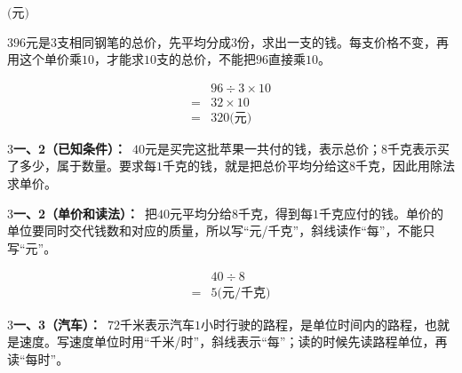 \documentclass[multi=snippet,border={5bp 20bp 5bp 5bp}]{standalone}
\newenvironment{snippet}[3]{\begin{minipage}{#1bp}\color{answerred}\fontsize{#2}{#3}\selectfont\raggedright}{\end{minipage}}
\begin{document}
\begin{snippet}{80}{10.0}{14}\SourceSans\setlength{\mathindent}{2bp}\(\text{(元)}\)\end{snippet}
\begin{snippet}{505}{11.5}{14}\begin{multicols}{3}\raggedcolumns \(96\)\allowbreak 元是\(3\)\allowbreak 支相同钢笔的总价，先平均分成\(3\)\allowbreak 份，求出一支的钱。每支价格不变，再用这个单价乘\(10\)\allowbreak ，才能求\(10\)\allowbreak 支的总价，不能把\(96\)\allowbreak 直接乘\(10\)\allowbreak 。\par \[\begin{aligned}&96\div3\times10\\={}&32\times10\\={}&320\text{(元)}\end{aligned}\]\end{multicols}\end{snippet}
\begin{snippet}{505}{11.5}{14}\begin{multicols}{3}\raggedcolumns \textbf{一、2（已知条件）：}\ \(40\)\allowbreak 元是买完这批苹果一共付的钱，表示总价；\(8\)\allowbreak 千克表示买了多少，属于数量。要求每\(1\)\allowbreak 千克的钱，就是把总价平均分给这\(8\)\allowbreak 千克，因此用除法求单价。\end{multicols}\end{snippet}
\begin{snippet}{505}{11.5}{14}\begin{multicols}{3}\raggedcolumns \textbf{一、2（单价和读法）：}\ 把\(40\)\allowbreak 元平均分给\(8\)\allowbreak 千克，得到每\(1\)\allowbreak 千克应付的钱。单价的单位要同时交代钱数和对应的质量，所以写“元/千克”，斜线读作“每”，不能只写“元”。\par \[\begin{aligned}&40\div8\\={}&5\text{(元/千克)}\end{aligned}\]\end{multicols}\end{snippet}
\begin{snippet}{505}{11.5}{14}\begin{multicols}{3}\raggedcolumns \textbf{一、3（汽车）：}\ \(72\)\allowbreak 千米表示汽车\(1\)\allowbreak 小时行驶的路程，是单位时间内的路程，也就是速度。写速度单位时用“千米/时”，斜线表示“每”；读的时候先读路程单位，再读“每时”。\end{multicols}\end{snippet}
\end{document}
